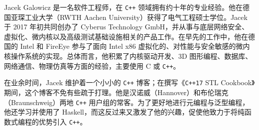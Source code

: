 Jacek Galowicz 是一名软件工程师，在 \texttt{C++} 领域拥有约十年的专业经验。他在德国亚琛工业大学（RWTH Aachen University）获得了电气工程硕士学位。Jacek 于 2017 年初共同创办了 Cyberus Technology GmbH，并从事与底层网络安全、虚拟化、微内核以及高级测试基础设施相关的产品工作。在早先的工作中，他在德国的 Intel 和 FireEye 参与了面向 Intel x86 虚拟化的、对性能与安全敏感的微内核操作系统的实现。总体而言，他积累了内核驱动开发、3D 图形编程、数据库、网络通信、物理仿真等方面的经验，主要使用 C 或 \texttt{C++}。

在业余时间，Jacek 维护着一个小小的 \texttt{C++} 博客；在撰写《\texttt{C++17} STL Cookbook》期间，这个博客不免有些疏于打理。他是汉诺威（Hannover）和布伦瑞克（Braunschweig）两地 \texttt{C++} 用户组的常客。为了更好地进行元编程与泛型编程，他还学习并使用了 Haskell，而这反过来又激发了他的兴趣，促使他致力于将纯函数式编程的优势引入 \texttt{C++}。
